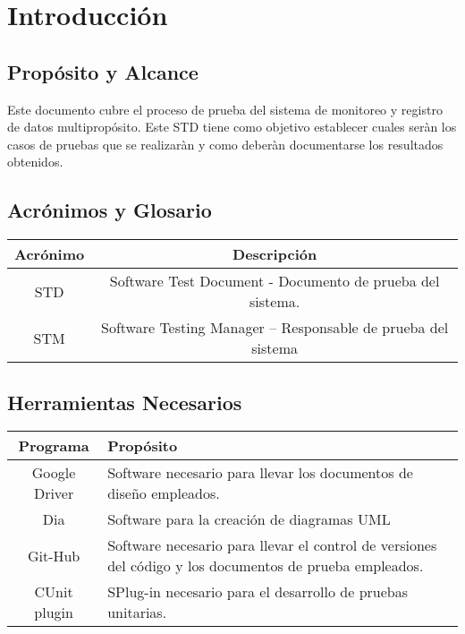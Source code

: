 \newpage
\section{\textcolor[gray]{.2}{Introducción}}
\subsection{\textcolor[gray]{.2}{Propósito y Alcance}}
Este documento cubre el proceso de prueba del sistema de monitoreo y registro de datos multipropósito. Este STD tiene como objetivo establecer cuales seràn los casos de pruebas que se realizaràn y como deberàn documentarse los resultados obtenidos.

\subsection{\textcolor[gray]{.2}{Acrónimos y Glosario}}
\begin{table}[!h]
\begin{center}
\begin{tabular}{|c|c|}
\hline
\rowcolor[gray]{.8} Acrónimo & Descripción \\
\hline
STD & Software Test Document - Documento de prueba del sistema. \\
\hline
STM & Software Testing Manager – Responsable de prueba del sistema\\
\hline
\end{tabular}
\end{center}
\end{table}

\subsection{\textcolor[gray]{.2}{Herramientas Necesarios}}
\begin{table}[!h]
\begin{center}
\begin{tabular}{|c|p{100mm}|}
\hline
\rowcolor[gray]{.8} Programa & Propósito \\
\hline
Google Driver & Software necesario para llevar los documentos de diseño empleados.\\
\hline
Dia & Software para la creación de diagramas UML\\
\hline
Git-Hub & Software necesario para llevar el control de versiones del código y los documentos de prueba empleados.\\
\hline
CUnit plugin & SPlug-in necesario para el desarrollo de pruebas unitarias.\\
\hline
\end{tabular}
\end{center}
\end{table}

